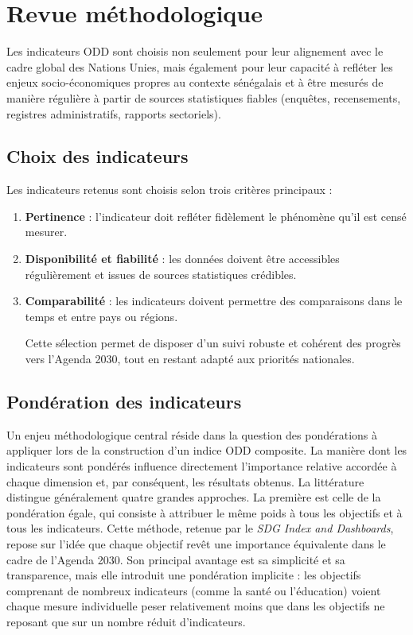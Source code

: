 \section{Revue méthodologique}


Les indicateurs ODD sont choisis non seulement pour leur alignement avec le cadre global des Nations Unies, mais également pour leur capacité à refléter les enjeux socio-économiques propres au contexte sénégalais et à être mesurés de manière régulière à partir de sources statistiques fiables (enquêtes, recensements, registres administratifs, rapports sectoriels).

\subsection*{Choix des indicateurs}

Les indicateurs retenus sont choisis selon trois critères principaux : 
\begin{simplebox} 
\begin{enumerate}
\item \textbf{Pertinence} : l’indicateur doit refléter fidèlement le phénomène qu’il est censé mesurer.  

\item \textbf{Disponibilité et fiabilité} : les données doivent être accessibles régulièrement et issues de sources statistiques crédibles.  

\item \textbf{Comparabilité} : les indicateurs doivent permettre des comparaisons dans le temps et entre pays ou régions.  

Cette sélection permet de disposer d’un suivi robuste et cohérent des progrès vers l’Agenda 2030, tout en restant adapté aux priorités nationales.
\end{enumerate}
\end{simplebox}


\subsection*{Pondération des indicateurs}
Un enjeu méthodologique central réside dans la question des pondérations à appliquer lors de la construction d’un indice ODD composite. La manière dont les indicateurs sont pondérés influence directement l’importance relative accordée à chaque dimension et, par conséquent, les résultats obtenus. La littérature distingue généralement quatre grandes approches. La première est celle de la pondération égale, qui consiste à attribuer le même poids à tous les objectifs et à tous les indicateurs. Cette méthode, retenue par le \textit{SDG Index and Dashboards}, repose sur l’idée que chaque objectif revêt une importance équivalente dans le cadre de l’Agenda 2030. Son principal avantage est sa simplicité et sa transparence, mais elle introduit une pondération implicite : les objectifs comprenant de nombreux indicateurs (comme la santé ou l’éducation) voient chaque mesure individuelle peser relativement moins que dans les objectifs ne reposant que sur un nombre réduit d’indicateurs.

